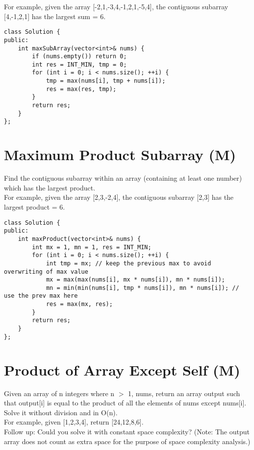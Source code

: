 For example, given the array [-2,1,-3,4,-1,2,1,-5,4], the contiguous subarray [4,-1,2,1] has the largest sum = 6. \\

\begin{lstlisting}
class Solution {
public:
    int maxSubArray(vector<int>& nums) {
        if (nums.empty()) return 0;
        int res = INT_MIN, tmp = 0;
        for (int i = 0; i < nums.size(); ++i) {
            tmp = max(nums[i], tmp + nums[i]);
            res = max(res, tmp);
        }
        return res;
    }
};
\end{lstlisting}


\section{Maximum Product Subarray (M)}
Find the contiguous subarray within an array (containing at least one number) which has the largest product.\\

For example, given the array [2,3,-2,4], the contiguous subarray [2,3] has the largest product = 6. \\

\begin{lstlisting}
class Solution {
public:
    int maxProduct(vector<int>& nums) {
        int mx = 1, mn = 1, res = INT_MIN;
        for (int i = 0; i < nums.size(); ++i) {
            int tmp = mx; // keep the previous max to avoid overwriting of max value
            mx = max(max(nums[i], mx * nums[i]), mn * nums[i]);
            mn = min(min(nums[i], tmp * nums[i]), mn * nums[i]); // use the prev max here
            res = max(mx, res);
        }
        return res;
    }
};
\end{lstlisting}


\section{Product of Array Except Self (M)}
Given an array of n integers where n $>$ 1, nums, return an array output such that output[i] is equal to the product of all the elements of nums except nums[i]. Solve it without division and in O(n). \\

For example, given [1,2,3,4], return [24,12,8,6].\\

Follow up: Could you solve it with constant space complexity? (Note: The output array does not count as extra space for the purpose of space complexity analysis.)\\

